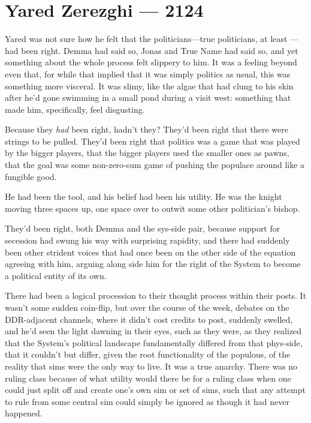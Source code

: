 \hypertarget{yared-zerezghi-2124}{%
\chapter{Yared Zerezghi — 2124}\label{yared-zerezghi-2124}}

Yared was not sure how he felt that the politicians---true politicians, at least — had been right. Demma had said so, Jonas and True Name had said so, and yet something about the whole process felt slippery to him. It was a feeling beyond even that, for while that implied that it was simply politics as usual, this was something more visceral. It was slimy, like the algae that had clung to his skin after he'd gone swimming in a small pond during a visit west: something that made him, specifically, feel disgusting.

Because they \emph{had} been right, hadn't they? They'd been right that there were strings to be pulled. They'd been right that politics was a game that was played by the bigger players, that the bigger players used the smaller ones as pawns, that the goal was some non-zero-sum game of pushing the populace around like a fungible good.

He had been the tool, and his belief had been his utility. He was the knight moving three spaces up, one space over to outwit some other politician's bishop.

They'd been right, both Demma and the sys-side pair, because support for secession had swung his way with surprising rapidity, and there had suddenly been other strident voices that had once been on the other side of the equation agreeing with him, arguing along side him for the right of the System to become a political entity of its own.

There had been a logical procession to their thought process within their posts. It wasn't some sudden coin-flip, but over the course of the week, debates on the DDR-adjacent channels, where it didn't cost credits to post, suddenly swelled, and he'd seen the light dawning in their eyes, such as they were, as they realized that the System's political landscape fundamentally differed from that phys-side, that it couldn't but differ, given the root functionality of the populous, of the reality that sims were the only way to live. It was a true anarchy. There was no ruling class because of what utility would there be for a ruling class when one could just split off and create one's own sim or set of sims, such that any attempt to rule from some central sim could simply be ignored as though it had never happened.

